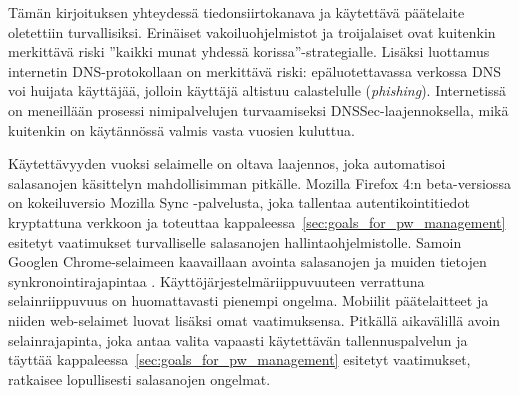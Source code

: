 \documentclass[english,gradu]{tktltiki}
\begin{document}
Tämän kirjoituksen yhteydessä tiedonsiirtokanava ja käytettävä päätelaite oletettiin turvallisiksi. Erinäiset vakoiluohjelmistot ja troijalaiset ovat kuitenkin merkittävä riski ''kaikki munat yhdessä korissa''-strategialle. Lisäksi luottamus internetin DNS-protokollaan on merkittävä riski: epäluotettavassa verkossa DNS voi huijata käyttäjää, jolloin käyttäjä altistuu calastelulle (\emph{phishing}).
Internetissä on meneillään prosessi nimipalvelujen turvaamiseksi DNSSec-laajennoksella, mikä kuitenkin on käytännössä valmis vasta vuosien kuluttua.

Käytettävyyden vuoksi selaimelle on oltava laajennos, joka automatisoi salasanojen käsittelyn mahdollisimman
pitkälle. Mozilla Firefox 4:n beta-versiossa on kokeiluversio Mozilla Sync -palvelusta, joka tallentaa
autentikointitiedot kryptattuna verkkoon ja toteuttaa kappaleessa~\ref{sec:goals_for_pw_management} esitetyt
vaatimukset turvalliselle salasanojen hallintaohjelmistolle. Samoin Googlen Chrome-selaimeen kaavaillaan avointa
salasanojen ja muiden tietojen synkronointirajapintaa \cite{chromium_sync_09}. Käyttöjärjestelmäriippuvuuteen
verrattuna selainriippuvuus on huomattavasti pienempi ongelma. Mobiilit päätelaitteet ja niiden web-selaimet
luovat lisäksi omat vaatimuksensa. Pitkällä aikavälillä avoin selainrajapinta, joka antaa valita vapaasti käytettävän tallennuspalvelun ja täyttää kappaleessa~\ref{sec:goals_for_pw_management} esitetyt vaatimukset, ratkaisee lopullisesti salasanojen ongelmat.





\lastpage
\end{document}
